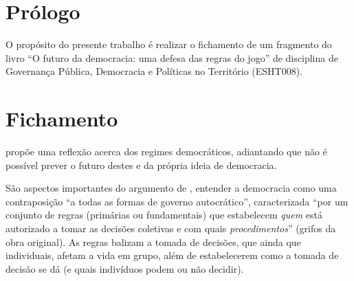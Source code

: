 \documentclass[
article,			%
11pt,				%
oneside,			%
a4paper,			%
english,			%
brazil,				%
sumario=tradicional
]{abntex2}
\begin{document}
	
	
	\frenchspacing 
	
	
	\maketitle
	

	\textual
	
	
	\section*{Prólogo}
	
	O propósito do presente trabalho é realizar o fichamento de um fragmento do livro ``O futuro da democracia: uma defesa das regras do jogo'' de  disciplina de Governança Pública, Democracia e Políticas no Território (ESHT008).
	
	\section{Fichamento}
	
	 propõe uma reflexão acerca dos regimes democráticos, adiantando que não é possível prever o futuro destes e da própria ideia de democracia.
	
	São aspectos importantes do argumento de , entender a democracia como uma contraposição ``a todas as formas de governo autocrático'', caracterizada ``por um conjunto de regras (primárias ou fundamentais) que estabelecem \textit{quem} está autorizado a tomar as decisões coletivas e com quais \textit{procedimentos}'' (grifos da obra original). As regras balizam a tomada de decisões, que ainda que individuais, afetam a vida em grupo, além de estabelecerem como a tomada de decisão se dá (e quais indivíduos podem ou não decidir).
	
\end{document}
